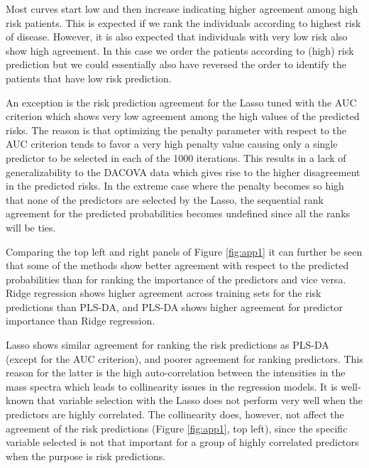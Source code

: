 \documentclass[oupdraft]{bio}
\begin{document}
Most curves start low and then increase indicating higher agreement
among high risk patients. This is expected if we rank the individuals
according to highest risk of disease. However, it is also expected
that individuals with very low risk also show high agreement. In this
case we order the patients according to (high) risk prediction but we
could essentially also have reversed the order to identify the
patients that have low risk prediction.

An exception is the risk prediction agreement for the Lasso tuned with the AUC criterion which
shows very low agreement among the high values of the predicted
risks. The reason is that optimizing the penalty parameter with
respect to the AUC criterion tends to favor a very high penalty value
causing only a single predictor to be selected in each of the 1000
iterations. This results in a lack of generalizability to the DACOVA
data which gives rise to the higher disagreement in the predicted risks.
In the extreme case where the penalty becomes so high
that none of the predictors are selected by the Lasso, the sequential
rank agreement for the predicted probabilities becomes undefined since
all the ranks will be ties.


Comparing the top left and right panels of Figure \ref{fig:app1} it can
further be seen that some of the methods show better agreement with
respect to the predicted probabilities than for ranking the importance
of the predictors and vice versa. Ridge regression shows higher agreement across training
sets for the risk predictions than PLS-DA, and PLS-DA shows higher
agreement for predictor importance than Ridge regression.

Lasso shows similar agreement for ranking the risk predictions as
PLS-DA (except for the AUC criterion), and poorer agreement for
ranking predictors. This reason for the latter is the high
auto-correlation between the intensities in the mass spectra which
leads to collinearity issues in the regression models. It is
well-known that variable selection with the Lasso does not
perform very well when the predictors are highly correlated. The
collinearity does, however, not affect the agreement of the risk
predictions (Figure \ref{fig:app1}, top left), since
the specific variable selected is not that important for 
a group of highly correlated predictors when the purpose is risk
predictions.
\end{document}
